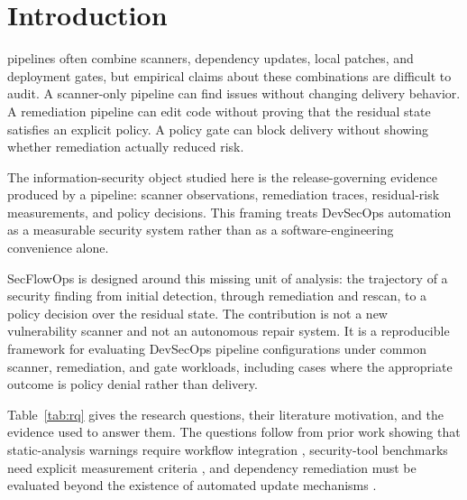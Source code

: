\section{Introduction}

 pipelines often combine scanners, dependency updates, local patches, and deployment gates, but empirical claims about these combinations are difficult to audit. A scanner-only pipeline can find issues without changing delivery behavior. A remediation pipeline can edit code without proving that the residual state satisfies an explicit policy. A policy gate can block delivery without showing whether remediation actually reduced risk.

The information-security object studied here is the release-governing evidence produced by a pipeline: scanner observations, remediation traces, residual-risk measurements, and policy decisions. This framing treats DevSecOps automation as a measurable security system rather than as a software-engineering convenience alone.

SecFlowOps is designed around this missing unit of analysis: the trajectory of a security finding from initial detection, through remediation and rescan, to a policy decision over the residual state. The contribution is not a new vulnerability scanner and not an autonomous repair system. It is a reproducible framework for evaluating DevSecOps pipeline configurations under common scanner, remediation, and gate workloads, including cases where the appropriate outcome is policy denial rather than delivery.

Table~\ref{tab:rq} gives the research questions, their literature motivation, and the evidence used to answer them. The questions follow from prior work showing that static-analysis warnings require workflow integration \cite{johnsonStaticAnalysis2013,bellerStaticAnalysis2016}, security-tool benchmarks need explicit measurement criteria \cite{pariziBenchmark2018}, and dependency remediation must be evaluated beyond the existence of automated update mechanisms \cite{decanNpm2018,mirhosseiniPullRequests2017}.

